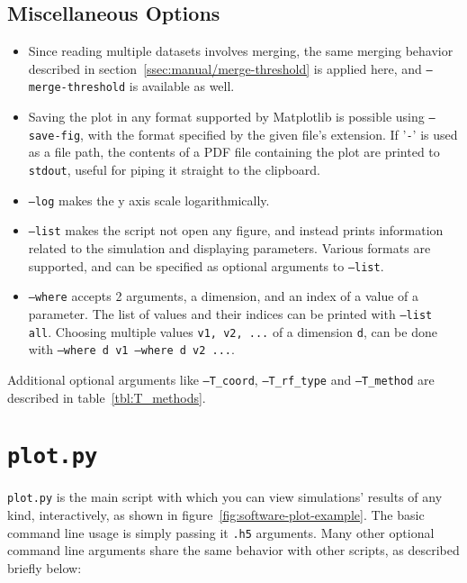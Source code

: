 \subsection{Miscellaneous Options}\label{ssec:manual/misc-options}

\begin{itemize}
	\item Since reading multiple datasets involves merging, the same merging behavior described in section~\ref{ssec:manual/merge-threshold} is applied here, and \texttt{--merge-threshold} is available as well.
	\item Saving the plot in any format supported by Matplotlib is possible using \texttt{--save-fig}, with the format specified by the given file's extension. If '\texttt{-}' is used as a file path, the contents of a PDF file containing the plot are printed to \texttt{stdout}, useful for piping it straight to the clipboard.
	\item \texttt{--log} makes the y axis scale logarithmically. 
	\item \texttt{--list} makes the script not open any figure, and instead prints information related to the simulation and displaying parameters. Various formats are supported, and can be specified as optional arguments to \texttt{--list}.
	\item \texttt{--where} accepts 2 arguments, a dimension, and an index of a value of a parameter. The list of values and their indices can be printed with \texttt{--list all}. Choosing multiple values \texttt{v1, v2, ...} of a dimension \texttt{d}, can be done with \texttt{--where d v1 --where d v2 ...}.
\end{itemize}

Additional optional arguments like \texttt{--T\_coord}, \texttt{--T\_rf\_type} and \texttt{--T\_method} are described in table~\ref{tbl:T_methods}.

\section{\texttt{plot.py}}\label{sec:manual/plot}

\texttt{plot.py} is the main script with which you can view simulations' results of any kind, interactively, as shown in figure~\ref{fig:software-plot-example}. The basic command line usage is simply passing it \texttt{.h5} arguments. Many other optional command line arguments share the same behavior with other scripts, as described briefly below:

